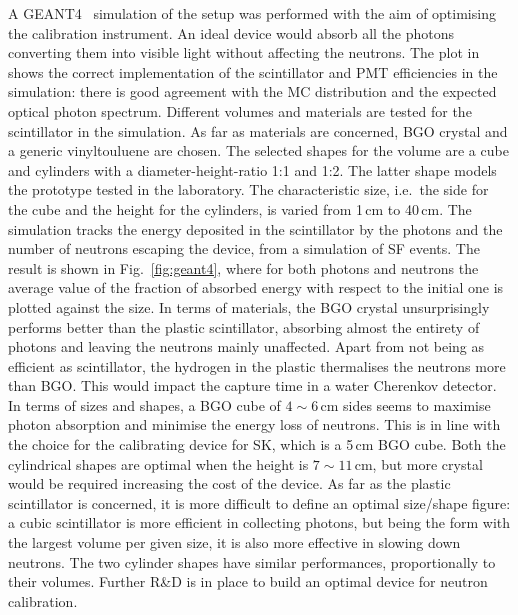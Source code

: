 A GEANT4~\cite{Agostinelli:2002hh} simulation of the setup was performed with the aim of optimising the calibration instrument.
An ideal device would absorb all the photons converting them into visible light without affecting the neutrons.
The plot in  shows the correct implementation of the scintillator and PMT efficiencies in the simulation: %
there is good agreement with the MC distribution and the expected optical photon spectrum.
Different volumes and materials are tested for the scintillator in the simulation.
As far as materials are concerned, BGO crystal and a generic vinyltouluene are chosen.
The selected shapes for the volume are a cube and cylinders with a diameter-height-ratio 1:1 and 1:2.
The latter shape models the prototype tested in the laboratory.
The characteristic size, i.e.\ the side for the cube and the height for the cylinders, is varied from 1\,cm to 40\,cm.
The simulation tracks the energy deposited in the scintillator by the photons and the number of neutrons escaping the device, %
from a simulation of  SF events.
The result is shown in Fig.~\ref{fig:geant4}, where for both photons and neutrons %
the average value of the fraction of absorbed energy with respect to the initial one is plotted against the size.
In terms of materials, the BGO crystal unsurprisingly performs better than the plastic scintillator, %
absorbing almost the entirety of photons and leaving the neutrons mainly unaffected.
Apart from not being as efficient as scintillator, the hydrogen in the plastic thermalises the neutrons more than BGO.
This would impact the capture time in a water Cherenkov detector.
In terms of sizes and shapes, a BGO cube of $4\sim6$\,cm sides seems to maximise photon absorption and minimise %
the energy loss of neutrons.
This is in line with the choice for the calibrating device for SK, which is a 5\,cm BGO cube.
Both the cylindrical shapes are optimal when the height is $7\sim11$\,cm, but more crystal would be required %
increasing the cost of the device.
As far as the plastic scintillator is concerned, it is more difficult to define an optimal size/shape figure:
a cubic scintillator is more efficient in collecting photons, but being the form with the largest volume %
per given size, it is also more effective in slowing down neutrons.
The two cylinder shapes have similar performances, proportionally to their volumes.
Further R\&D is in place to build an optimal device for neutron calibration.


